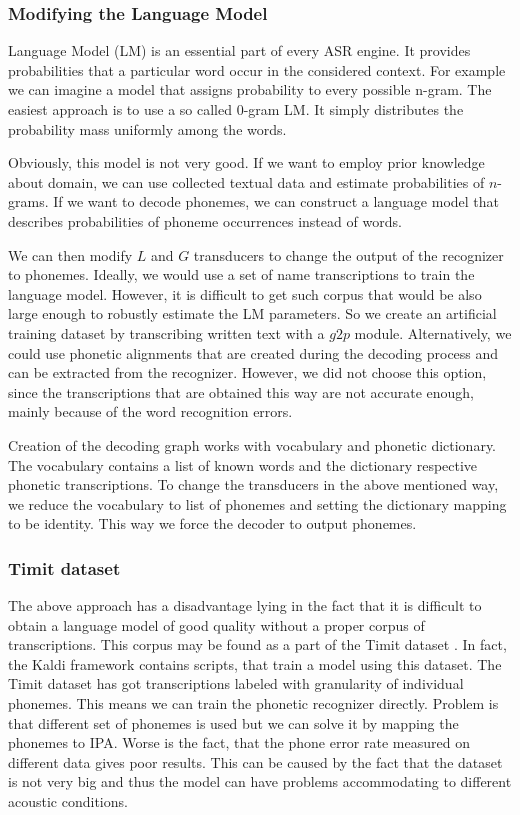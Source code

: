 \subsubsection{Modifying the Language Model}
Language Model (LM) is an essential part of every ASR engine.
It provides probabilities that a particular word occur in the considered context. 
For example we can imagine a model that assigns probability to every possible n-gram.
The easiest approach is to use a so called 0-gram LM.
It simply distributes the probability mass uniformly among the words.
\par
Obviously, this model is not very good.
If we want to employ prior knowledge about domain, we can use collected textual data and estimate probabilities of $n$-grams.
If we want to decode phonemes, we can construct a language model that describes probabilities of phoneme occurrences instead of words.
\par
We can then modify $L$ and $G$ transducers to change the output of the recognizer to phonemes.
Ideally, we would use a set of name transcriptions to train the language model.
However, it is difficult to get such corpus that would be also large enough to robustly estimate the LM parameters.
So we create an artificial training dataset by transcribing written text with a $g2p$ module.
Alternatively, we could use phonetic alignments that are created during the decoding process and can be extracted from the recognizer.
However, we did not choose this option, since the transcriptions that are obtained this way are not accurate enough, mainly because of the word recognition errors.
\par
Creation of the decoding graph works with vocabulary and phonetic dictionary.
The vocabulary contains a list of known words and the dictionary respective phonetic transcriptions. 
To change the transducers in the above mentioned way, we reduce the vocabulary to list of phonemes and setting the dictionary mapping to be identity.
This way we force the decoder to output phonemes.
\subsubsection{Timit dataset}
The above approach has a disadvantage lying in the fact that it is difficult to obtain a language model of good quality without a proper corpus of transcriptions.
This corpus may be found as a part of the Timit dataset \cite{lopes2011phoneme}.
In fact, the Kaldi framework contains scripts, that train a model using this dataset.
The Timit dataset has got transcriptions labeled with granularity of individual phonemes.
This means we can train the phonetic recognizer directly.
Problem is that different set of phonemes is used but we can solve it by mapping the phonemes to IPA.
Worse is the fact, that the phone error rate measured on different data gives poor results.
This can be caused by the fact that the dataset is not very big and thus the model can have problems accommodating to different acoustic conditions.  
